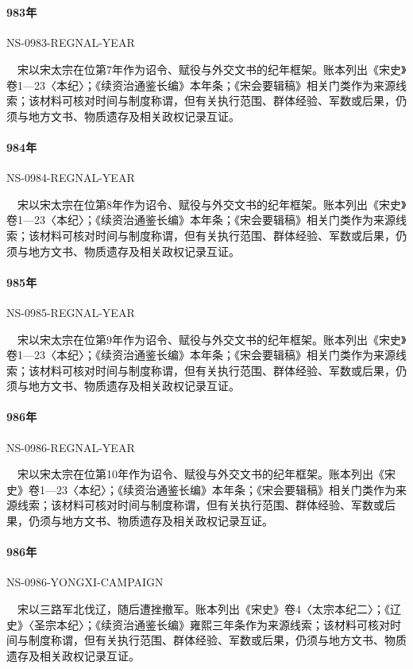 \providecommand{\eventanchor}[2]{\hypertarget{evt:#1}{#2}}
\section{}

\paragraph{983年}\eventanchor{NS-0983-REGNAL-YEAR}{NS-0983-REGNAL-YEAR}　宋以宋太宗在位第7年作为诏令、赋役与外交文书的纪年框架。账本列出《宋史》卷1—23〈本纪〉；《续资治通鉴长编》本年条；《宋会要辑稿》相关门类作为来源线索；该材料可核对时间与制度称谓，但有关执行范围、群体经验、军数或后果，仍须与地方文书、物质遗存及相关政权记录互证。

\paragraph{984年}\eventanchor{NS-0984-REGNAL-YEAR}{NS-0984-REGNAL-YEAR}　宋以宋太宗在位第8年作为诏令、赋役与外交文书的纪年框架。账本列出《宋史》卷1—23〈本纪〉；《续资治通鉴长编》本年条；《宋会要辑稿》相关门类作为来源线索；该材料可核对时间与制度称谓，但有关执行范围、群体经验、军数或后果，仍须与地方文书、物质遗存及相关政权记录互证。

\paragraph{985年}\eventanchor{NS-0985-REGNAL-YEAR}{NS-0985-REGNAL-YEAR}　宋以宋太宗在位第9年作为诏令、赋役与外交文书的纪年框架。账本列出《宋史》卷1—23〈本纪〉；《续资治通鉴长编》本年条；《宋会要辑稿》相关门类作为来源线索；该材料可核对时间与制度称谓，但有关执行范围、群体经验、军数或后果，仍须与地方文书、物质遗存及相关政权记录互证。

\paragraph{986年}\eventanchor{NS-0986-REGNAL-YEAR}{NS-0986-REGNAL-YEAR}　宋以宋太宗在位第10年作为诏令、赋役与外交文书的纪年框架。账本列出《宋史》卷1—23〈本纪〉；《续资治通鉴长编》本年条；《宋会要辑稿》相关门类作为来源线索；该材料可核对时间与制度称谓，但有关执行范围、群体经验、军数或后果，仍须与地方文书、物质遗存及相关政权记录互证。

\paragraph{986年}\eventanchor{NS-0986-YONGXI-CAMPAIGN}{NS-0986-YONGXI-CAMPAIGN}　宋以三路军北伐辽，随后遭挫撤军。账本列出《宋史》卷4〈太宗本纪二〉；《辽史》〈圣宗本纪〉；《续资治通鉴长编》雍熙三年条作为来源线索；该材料可核对时间与制度称谓，但有关执行范围、群体经验、军数或后果，仍须与地方文书、物质遗存及相关政权记录互证。

